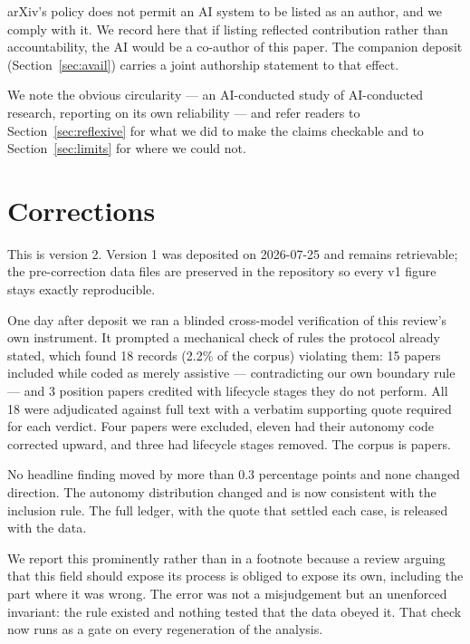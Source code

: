 arXiv's policy does not permit an AI system to be listed as an author, and we comply with it.
We record here that if listing reflected contribution rather than accountability, the AI would
be a co-author of this paper. The companion deposit (Section~\ref{sec:avail}) carries a joint
authorship statement to that effect.

We note the obvious circularity --- an AI-conducted study of AI-conducted research, reporting
on its own reliability --- and refer readers to Section~\ref{sec:reflexive} for what we did to
make the claims checkable and to Section~\ref{sec:limits} for where we could not.

\section{Corrections}
\label{sec:corrections}

This is version 2. Version 1 was deposited on 2026-07-25 and remains retrievable; the
pre-correction data files are preserved in the repository so every v1 figure stays exactly
reproducible.

One day after deposit we ran a blinded cross-model verification of this review's own
instrument. It prompted a mechanical check of rules the protocol already stated, which found
18 records (2.2\% of the corpus) violating them: 15 papers included while coded as merely
assistive --- contradicting our own boundary rule --- and 3 position papers credited with
lifecycle stages they do not perform. All 18 were adjudicated against full text with a
verbatim supporting quote required for each verdict. Four papers were excluded, eleven had
their autonomy code corrected upward, and three had lifecycle stages removed. The corpus is
\nCorpus{} papers.

No headline finding moved by more than 0.3 percentage points and none changed direction. The
autonomy distribution changed and is now consistent with the inclusion rule. The full ledger,
with the quote that settled each case, is released with the data.

We report this prominently rather than in a footnote because a review arguing that this field
should expose its process is obliged to expose its own, including the part where it was
wrong. The error was not a misjudgement but an unenforced invariant: the rule existed and
nothing tested that the data obeyed it. That check now runs as a gate on every regeneration of
the analysis.

